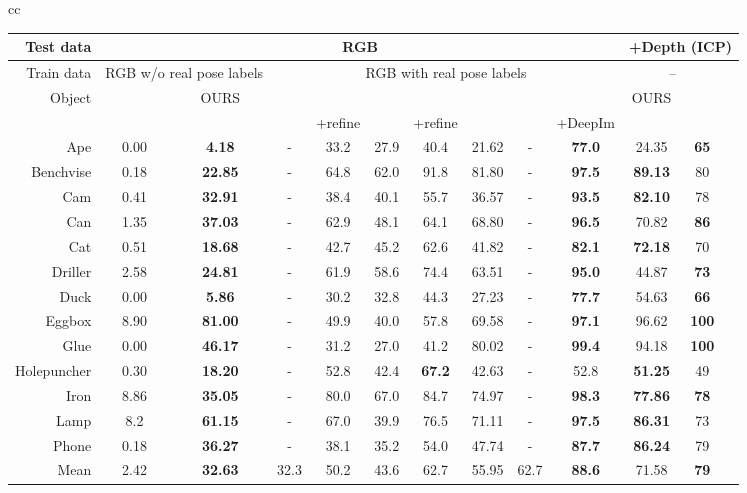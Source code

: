 \begin{table}[t]
\begin{tabular}{cc}
\begin{table*}[t]
\begin{adjustbox}{max width=\textwidth}
\begin{tabular}{r|cc|ccccccc|ccc}
			Test data&\multicolumn{9}{c}{RGB}& \multicolumn{3}{|c}{ +Depth (ICP)}\\
			\toprule
			Train data&\multicolumn{2}{c|}{RGB w/o real pose labels}& \multicolumn{7}{c}{RGB with real pose labels} & \multicolumn{2}{|c}{--}\\
			\toprule
			Object &\citeauthor{kehl2017ssd} & OURS & \multicolumn{2}{c}{\citeauthor{brachmann2016uncertainty}} & \multicolumn{2}{c}{\citeauthor{rad2017bb8}} &\citeauthor{tekin2017real} & \multicolumn{2}{c|}{\citeauthor{xiang2017posecnn}} & OURS & \citeauthor{kehl2017ssd} \\
			\toprule
			&&&& +refine && +refine &&& +DeepIm \\
			\midrule
			Ape & 0.00 &   \textbf{4.18} &      -& 	33.2& 27.9& 40.4& 21.62            & -& \textbf{77.0} & 24.35 &\textbf{65}\\
			Benchvise &  0.18 &\textbf{22.85}&  -& 	64.8& 62.0& 91.8& 81.80   & -& \textbf{97.5} & \textbf{89.13}&80\\
			Cam &0.41 & \textbf{32.91}&         -& 	38.4& 40.1& 55.7& 36.57            & -& \textbf{93.5} & \textbf{82.10}&78\\
			Can & 1.35 &   \textbf{37.03}&      -& 	62.9& 48.1& 64.1& 68.80   & -& \textbf{96.5} & 70.82&\textbf{86}\\
			Cat &  0.51 & \textbf{18.68}&       -& 	42.7& 45.2& 62.6& 41.82            & -& \textbf{82.1} & \textbf{72.18}&70\\
			Driller &  2.58 & \textbf{24.81}&   -& 	61.9& 58.6& 74.4& 63.51   & -& \textbf{95.0} & 44.87&\textbf{73}\\
			Duck & 0.00 & \textbf{5.86}&        -& 	30.2& 32.8& 44.3& 27.23            & -& \textbf{77.7} & 54.63 &\textbf{66}\\
			Eggbox & 8.90 & \textbf{81.00}&     -& 	49.9& 40.0& 57.8& 69.58   & -& \textbf{97.1} & 96.62&\textbf{100}\\
			Glue&0.00  & \textbf{46.17}&        -& 	31.2& 27.0& 41.2& 80.02   & -& \textbf{99.4} & 94.18&\textbf{100}\\
			Holepuncher & 0.30 &\textbf{18.20}& -& 	52.8& 42.4& \textbf{67.2}& 42.63   & -& 52.8 & \textbf{51.25}&49\\
			Iron & 8.86 &\textbf{35.05} &       -& 	80.0& 67.0& 84.7& 74.97   & -& \textbf{98.3} & \textbf{77.86}&\textbf{78}\\
			Lamp & 8.2 & \textbf{61.15} &       -& 	67.0& 39.9& 76.5& 71.11   & -& \textbf{97.5} & \textbf{86.31}&73\\
			Phone & 0.18 &\textbf{36.27} &      -& 	38.1& 35.2& 54.0& 47.74   & -& \textbf{87.7} & \textbf{86.24}&79\\
			\midrule
			Mean &  2.42& \textbf{32.63}  & 32.3   & 50.2 & 43.6& 62.7 & 55.95  & 62.7 & \textbf{88.6} & 71.58 & \textbf{79}
		\end{tabular}
	\end{adjustbox}
	\label{tab:linemod}
\end{table*}




\end{tabular}
\end{table}
